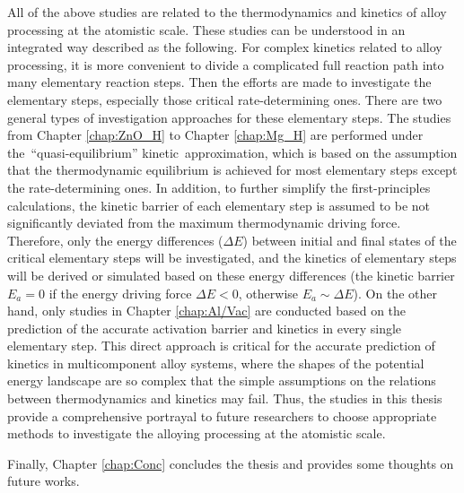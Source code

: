 All of the above studies are related to the thermodynamics and kinetics of alloy processing at the atomistic scale. These studies can be understood in an integrated way described as the following. For complex kinetics related to alloy processing, it is more convenient to divide a complicated full reaction path into many elementary reaction steps. Then the efforts are made to investigate the elementary steps, especially those critical rate-determining ones. There are two general types of investigation approaches for these elementary steps. The studies from Chapter \ref{chap:ZnO_H} to Chapter \ref{chap:Mg_H} are performed under the ``quasi-equilibrium'' kinetic approximation, which is based on the assumption that the thermodynamic equilibrium is achieved for most elementary steps except the rate-determining ones. In addition, to further simplify the first-principles calculations, the kinetic barrier of each elementary step is assumed to be not significantly deviated from the maximum thermodynamic driving force. Therefore, only the energy differences ($\Delta E$) between initial and final states of the critical elementary steps will be investigated, and the kinetics of elementary steps will be derived or simulated based on these energy differences (the kinetic barrier $E_a = 0$ if the energy driving force $\Delta E < 0$, otherwise $E_a \sim \Delta E$). On the other hand, only studies in Chapter \ref{chap:Al/Vac} are conducted based on the prediction of the accurate activation barrier and kinetics in every single elementary step. This direct approach is critical for the accurate prediction of kinetics in multicomponent alloy systems, where the shapes of the potential energy landscape are so complex that the simple assumptions on the relations between thermodynamics and kinetics may fail.  Thus, the studies in this thesis provide a comprehensive portrayal to future researchers to choose appropriate methods to investigate the alloying processing at the atomistic scale.

Finally, Chapter \ref{chap:Conc} concludes the thesis and provides some thoughts on future works.
